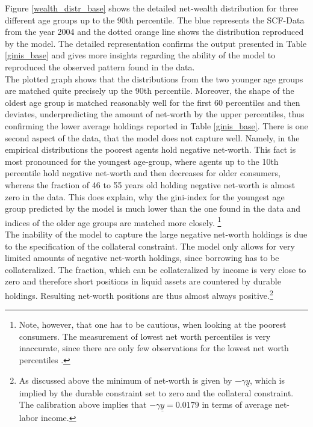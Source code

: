 \documentclass[a4paper,12pt,legno]{article}
\begin{document}
Figure \ref{wealth_distr_base} shows the detailed net-wealth distribution for three different age groups up to the 90th percentile. The blue represents the SCF-Data from the year 2004 and the dotted orange line shows the distribution reproduced by the model. The detailed representation confirms the output presented in Table \ref{ginis_base} and gives more insights regarding the ability of the model to reproduced the observed pattern found in the data. \\ 
The plotted graph shows that the distributions from the two younger age groups are matched quite precisely up the 90th percentile. Moreover, the shape of the oldest age group is matched reasonably well for the first 60 percentiles and then deviates, underpredicting the amount of net-worth by the upper percentiles, thus confirming the lower average holdings reported in Table \ref{ginis_base}. There is one second aspect of the data, that the model does not capture well. Namely, in the empirical distributions the poorest agents hold negative net-worth. This fact is most pronounced for the youngest age-group, where agents up to the 10th percentile hold negative net-worth and then decreases for older consumers, whereas the fraction of 46 to 55 years old holding negative net-worth is almost zero in the data. This does explain, why the gini-index for the youngest age group predicted by the model is much lower than the one found in the data and indices of the older age groups are matched more closely. \footnote{Note, however, that one has to be cautious, when looking at the poorest consumers. The measurement of lowest net worth percentiles is very inaccurate, since there are only few observations for the lowest net worth percentiles \citep{hintermaier2011}.} 
\\ The inability of the model to capture the large negative net-worth holdings is due to the specification of the collateral constraint. The model only allows for very limited amounts of negative net-worth holdings, since borrowing has to be collateralized. The fraction, which can be collateralized by income is very close to zero and therefore short positions in liquid assets are countered by durable holdings. Resulting net-worth positions are thus almost always positive.\footnote{As discussed above the minimum of net-worth is given by $-\gamma\underline{y}$, which is implied by the durable constraint set to zero and the collateral constraint. The calibration above implies that $-\gamma\underline{y} = 0.0179$ in terms of average net-labor income.} 
\end{document}
